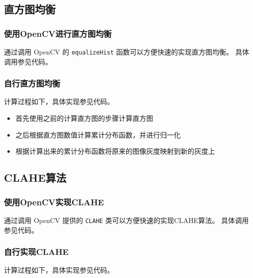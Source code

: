 \documentclass{article}
\begin{document}
\subsection{直方图均衡}

\subsubsection{使用OpenCV进行直方图均衡}

通过调用 OpenCV 的 \texttt{equalizeHist} 函数可以方便快速的实现直方图均衡。
具体调用参见代码。

\subsubsection{自行直方图均衡}

计算过程如下，具体实现参见代码。

\begin{itemize}
    \item 首先使用之前的计算直方图的步骤计算直方图
    \item 之后根据直方图数值计算累计分布函数，并进行归一化
    \item 根据计算出来的累计分布函数将原来的图像灰度映射到新的灰度上
\end{itemize}

\subsection{CLAHE算法}

\subsubsection{使用OpenCV实现CLAHE}

通过调用 OpenCV 提供的 \texttt{CLAHE} 类可以方便快速的实现CLAHE算法。
具体调用参见代码。

\subsubsection{自行实现CLAHE}

计算过程如下，具体实现参见代码。
\end{document}
